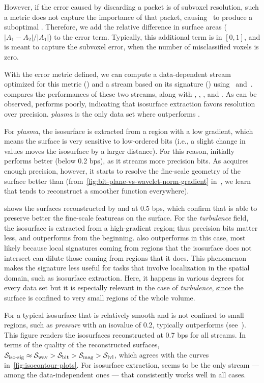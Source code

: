 However, if the error caused by discarding a packet is of subvoxel resolution, such a metric does
not capture the importance of that packet, causing~ to produce a suboptimal \siop.
Therefore, we add the relative difference in surface areas ($|A_1-A_2|/|A_1|$) to the error term.
Typically, this additional term is in $[0, 1]$, and is meant to capture the subvoxel
error, when the number of misclassified voxels is zero.

With the error metric defined, we can compute a data-dependent stream optimized for this metric
(\siop) and a stream based on its signature (\sisg) using~
and~.  compares the performances of these two
streams, along with \sbit, \slvl, \swav, and \smag. As can be observed, \slvl performs poorly,
indicating that isosurface extraction favors resolution over precision. \emph{plasma} is the only
data set where \sbit outperforms \swav.

For \emph{plasma}, the isosurface is extracted from a region with a low gradient, which means the
surface is very sensitive to low-ordered bits (i.e., a slight change in values moves the isosurface
by a larger distance). For this reason, \swav initially performs better (below 0.2 bps), as it
streams more precision bits. As \sbit acquires enough precision, however, it starts to resolve the
fine-scale geometry of the surface better than \swav
(from~\autoref{fig:bit-plane-vs-wavelet-norm-gradient} in~, we learn that \swav
tends to reconstruct a smoother function everywhere).

 shows the surfaces reconstructed by \sbit
and \swav at 0.5 bps, which confirm that \sbit is able to preserve better the fine-scale featureas
on the surface. For the \emph{turbulence} field, the isosurface is extracted from a high-gradient
region; thus precision bits matter less, and \sbit outperforms \swav from the beginning. \sbit also
outperforms \sisg in this case, most likely because local signatures coming from regions that the
isosurface does not intersect can dilute those coming from regions that it does. This phenomenon
makes the signature less useful for tasks that involve localization in the spatial domain, such as
isosurface extraction. Here, it happens in various degrees for every data set but it is especially
relevant in the case of \emph{turbulence}, since the surface is confined to very small regions of
the whole volume.

For a typical isosurface that is relatively smooth and is not confined to small regions, such as
\emph{pressure} with an isovalue of 0.2, \swav typically outperforms \sbit
(see~). This figure
renders the isosurfaces reconstructed at 0.7 bps for all streams. In terms of the quality of the
reconstructed surfaces, $\sisg \approx \swav > \sbit > \smag > \slvl$, which agrees with the curves
in~\autoref{fig:isocontour-plots}. For isosurface extraction, \swav seems to be the only stream ---
among the data-independent ones --- that consistently works well in all cases.
